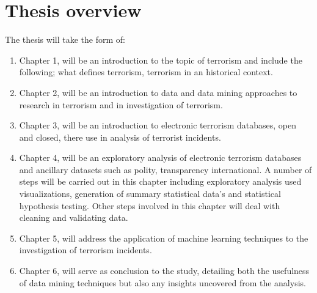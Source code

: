 \documentclass[11pt,twocolumn]{article}
\begin{document}
\section*{\textbf{Thesis overview}}
The thesis will take the form of:
\begin{enumerate}
\item Chapter 1, will be an introduction to the topic of terrorism and include the following; what defines terrorism, terrorism in an historical context.
\item Chapter 2, will be an introduction to data and data mining approaches to research in terrorism and in investigation of terrorism.
\item Chapter 3, will be an introduction to electronic terrorism databases, open and closed, there use in analysis of terrorist incidents.
\item Chapter 4, will be an exploratory analysis of electronic terrorism databases and ancillary datasets such as polity, transparency international. A number of steps will be carried out in this chapter including exploratory analysis used visualizations, generation of summary statistical data's and statistical hypothesis testing. Other steps involved in this chapter will deal with cleaning and validating data. 
\item Chapter 5, will address the application of machine learning techniques to the investigation of terrorism incidents.
\item Chapter 6, will serve as conclusion to the study, detailing both the usefulness of data mining techniques but also any insights uncovered from the analysis.
\end{enumerate}

\end{document}

